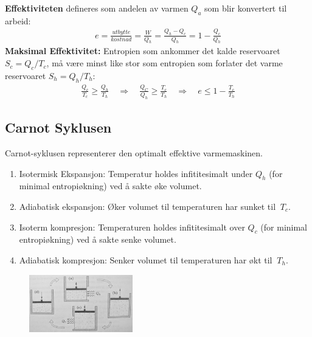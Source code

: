 \documentclass[10pt,a4paper]{article}
\renewcommand{\b}{\textbf}
\begin{document}
\begin{multicols}{2}
\begin{framed}
\b{Effektiviteten} defineres som andelen av varmen $Q_a$ som blir konvertert til arbeid:
\begin{align*}
	e = \frac{utbytte}{kostnad} = \frac{W}{Q_h} = \frac{Q_h - Q_c}{Q_h} = 1 - \frac{Q_c}{Q_h}
\end{align*}
\b{Maksimal Effektivitet:} Entropien som ankommer det kalde reservoaret $S_c = Q_c/T_c$, må være minst like stor som entropien som forlater det varme reservoaret $S_h = Q_h/T_h$:
\begin{align*}
	\frac{Q_c}{T_c} \geq \frac{Q_h}{T_h} \quad \Rightarrow \quad \frac{Q_C}{Q_h} \geq \frac{T_c}{T_h} \quad \Rightarrow \quad e \leq 1 - \frac{T_c}{T_h}
\end{align*}
\end{framed}


\subsection*{Carnot Syklusen}
\begin{framed}
Carnot-syklusen representerer den optimalt effektive varmemaskinen.

\begin{enumerate}
	\item Isotermisk Ekspansjon: Temperatur holdes infititesimalt under $Q_h$ (for minimal entropiøkning) ved å sakte øke volumet.\\
	\item Adiabatisk ekspansjon: Øker volumet til temperaturen har sunket til $~T_c$.
	\item Isoterm kompresjon: Temperaturen holdes infititesimalt over $Q_c$ (for minimal entropiøkning) ved å sakte senke volumet.\\
	\item Adiabatisk kompresjon: Senker volumet til temperaturen har økt til $~T_h$.
\end{enumerate}
\end{framed}


\begin{figure}[H]
\centering
	\includegraphics[width=0.4\textwidth]{figures/carnot_cycle2.jpg}
\end{figure}


\end{multicols}
\end{document}
